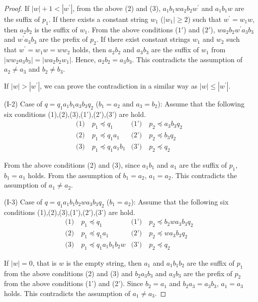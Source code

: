 \begin{proof}
If $|w|+1 < |w^{\prime}|$, from the above (2) and (3), 
$a_{1}b_{1}wa_{2}b_{2}w^{\prime}$ and $a_{1}b_{1}w$ are the suffix of $p_{1}$.
If there exists a constant string $w_{1}$ ($|w_{1}|\geq 2$) such that $w^{\prime}=w_{1}w$, then $a_{2}b_{2}$ is the suffix of $w_{1}$.
From  the above conditions ($1'$) and ($2'$), 
$wa_{2}b_{2}w^{\prime}a_{3}b_{3}$ and $w^{\prime}a_{3}b_{3}$ are the prefix of $p_{2}$.
If there exist constant strings $w_{1}$ and $w_{2}$ such that $w^{\prime} = w_{1}w=ww_{2}$ holds, then $a_{2}b_{2}$ and $a_{3}b_{3}$ are the suffix of $w_{1}$ from $|ww_{2}a_{3}b_{3}|=|wa_{2}b_{2}w_{1}|$.
Hence, $a_{2}b_{2}=a_{3}b_{3}$.
This contradicts the assumption of $a_{2} \ne a_{3}$ and $b_{2} \ne b_{3}$.

If $|w|>|w^{\prime}|$, we can prove the contradiction in a similar way as $|w|\le|w^{\prime}|$.

\smallskip

\noindent
(I-2) Case of $q=q_{1}a_{1}b_{1}a_{3}b_{3}q_{2}$ ($b_{1}=a_{2}$ and $a_{3}=b_{2}$):
Assume that the following six conditions (1),(2),(3),(1'),(2'),(3') are hold.
\begin{align*}
\textrm{(1)}~& p_{1} \preceq q_{1} & \textrm{(1')}~& p_{2} \preceq a_{3}b_{3}q_{2} \\
\textrm{(2)}~& p_{1} \preceq q_{1}a_{1} & \textrm{(2')}~& p_{2} \preceq b_{3}q_{2} \\
\textrm{(3)}~& p_{1} \preceq q_{1}a_{1}b_{1} & \textrm{(3')}~& p_{2} \preceq q_{2}
\end{align*}

\noindent
From the above conditions (2) and (3), since $a_{1}b_{1}$ and $a_{1}$ are the suffix of $p_{1}$, 
$b_{1} = a_{1}$ holds.
From the assumption of $b_{1}=a_{2}$, $a_{1}=a_{2}$.
This contradicts the assumption of $a_{1}\not= a_{2}$.
\smallskip

\noindent
(I-3) Case of $q=q_{1}a_{1}b_{1}b_{2}wa_{3}b_{3}q_{2}$ ($b_{1}=a_{2}$):
Assume that the following six conditions (1),(2),(3),(1'),(2'),(3') are hold.
\begin{align*}
\textrm{(1)}~& p_{1} \preceq q_{1} & \textrm{(1')}~& p_{2} \preceq b_{2}wa_{3}b_{3}q_{2} \\
\textrm{(2)}~& p_{1} \preceq q_{1}a_{1} & \textrm{(2')}~& p_{2} \preceq wa_{3}b_{3}q_{2} \\
\textrm{(3)}~& p_{1} \preceq q_{1}a_{1}b_{1}b_{2}w & \textrm{(3')}~& p_{2} \preceq q_{2}
\end{align*}

If $|w|=0$, that is $w$ is the empty string, then $a_{1}$ and $a_{1}b_{1}b_{2}$ are the suffix of $p_{1}$ from the above conditions (2) and (3)
and $b_{2}a_{3}b_{3}$ and $a_{3}b_{3}$ are the prefix of $p_{2}$ from the above conditions (1') and (2').
Since $b_{2}=a_{1}$ and $b_{2}a_{3}=a_{3}b_{3}$, $a_{1}=a_{3}$ holds.
This contradicts the assumption of $a_{1}\not= a_{3}$.


\end{proof}
